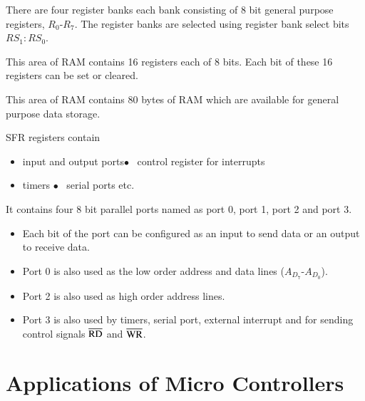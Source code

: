 \medskip
{}

\smallskip
There are four register banks each bank consisting of 8 bit general purpose registers, $R_{0}$-$R_{7}$. The register banks are selected using register bank select bits $RS_{1}:RS_{0}$.

\medskip
{}

\smallskip
This area of RAM contains 16 registers each of 8 bits. Each bit of these 16 registers can be set or cleared.

\medskip
{}

\smallskip
This area of RAM contains 80 bytes of RAM which are available for general purpose data storage.

\medskip
{}

\smallskip
SFR registers contain
\begin{itemize}
\item input and output ports\qquad $\bullet$~ control register for interrupts

\item timers\hspace{3.1cm} $\bullet$~ serial ports etc.
\end{itemize}


\smallskip
It contains four 8 bit parallel ports named as port 0, port 1, port 2 and port 3.
\begin{itemize}
\item Each bit of the port can be configured as an input to send data or an output to receive data.

\item Port 0 is also used as the low order address and data lines ($A_{D_7}$-$A_{D_0}$).

\item Port 2 is also used as high order address lines.

\item Port 3 is also used by timers, serial port, external interrupt and for sending control signals $\overline{\rm RD}$ and $\overline{\rm WR}$.
\end{itemize}

\section{Applications of Micro Controllers}\label{sec7.15}

